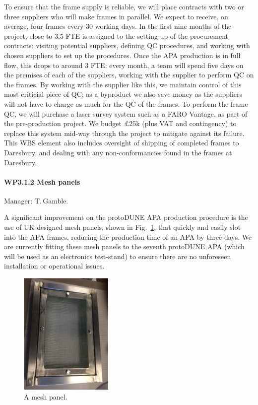 To ensure that the frame supply is reliable, we will place contracts with two or three suppliers who will make frames in parallel. We expect to receive, on average, four frames every 30 working days.
In the first nine months of the project, close to 3.5 FTE is assigned to the setting up of the procurement contracts: visiting potential suppliers, defining QC procedures, and working with chosen suppliers to set up the procedures. Once the APA production is in full flow, this drops to around 3 FTE: every month, a team will spend five days on the premises of each of the suppliers, working with the supplier to perform QC on the frames. By working with the supplier like this, we maintain control of this most criticial piece of QC; as a byproduct we also save money as the suppliers will not have to charge as much for the QC of the frames. To perform the frame QC, we will purchase a laser survey system such as a FARO Vantage, as part of the pre-production project. We budget £25k (plus VAT and contingency) to replace this system mid-way through the project to mitigate against its failure. This WBS element also includes oversight of shipping of completed frames to Daresbury, and dealing with any non-conformancies found in the frames at Daresbury.

\paragraph{WP3.1.2 Mesh panels} Manager: T.\,Gamble.

A significant improvement on the protoDUNE APA production procedure is the use of UK-designed mesh panels, shown in Fig.~\ref{fig:MeshPanel}, that quickly and easily slot into the APA frames, reducing the production time of an APA by three days. We are currently fitting these mesh panels to the seventh protoDUNE APA (which will be used as an electronics test-stand) to ensure there are no unforeseen installation or operational issues.

\begin{figure}
    \centering
    \includegraphics[width=0.4\textwidth]{figs/WP3/MeshPanel.png}
    \caption{A mesh panel.}
    \label{fig:MeshPanel}
\end{figure}

